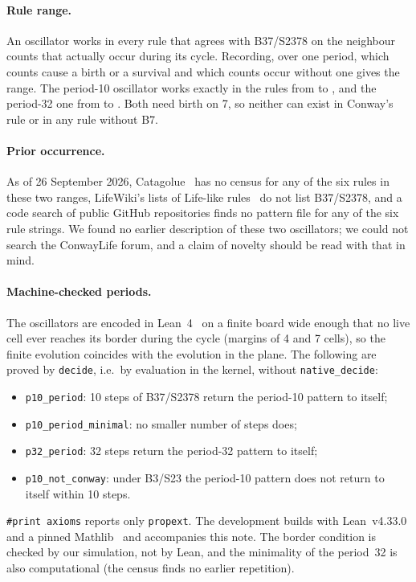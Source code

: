 \documentclass[11pt,a4paper]{article}
\begin{document}
\paragraph{Rule range.} An oscillator works in every rule that agrees with B37/S2378
on the neighbour counts that actually occur during its cycle. Recording, over one
period, which counts cause a birth or a survival and which counts occur without one
gives the range. The period-10 oscillator works exactly in the rules from
\minDiez{} to \maxDiez{}, and the period-32 one from \minTreintaydos{} to
\maxTreintaydos{}. Both need birth on 7, so neither can exist in Conway's rule or in any
rule without B7.

\paragraph{Prior occurrence.} As of 26 September 2026, Catagolue~\cite{catagolue} has
no census for any of the six rules in these two ranges, LifeWiki's lists of Life-like
rules~\cite{lifewiki-lifelike,lifewiki-universal} do not list B37/S2378, and a code
search of public GitHub repositories finds no pattern file for any of the six rule
strings. We found no earlier description of these two oscillators; we could not
search the ConwayLife forum, and a claim of novelty should be read with that in mind.

\paragraph{Machine-checked periods.} The oscillators are encoded in Lean~4~\cite{lean4} on a finite
board wide enough that no live cell ever reaches its border during the cycle (margins
of 4 and 7 cells), so the finite evolution coincides with the evolution in the plane.
The following are proved by \texttt{decide}, i.e.\ by evaluation in the kernel, without
\texttt{native\_decide}:
\begin{itemize}
\item \texttt{p10\_period}: 10 steps of B37/S2378 return the period-10 pattern to itself;
\item \texttt{p10\_period\_minimal}: no smaller number of steps does;
\item \texttt{p32\_period}: 32 steps return the period-32 pattern to itself;
\item \texttt{p10\_not\_conway}: under B3/S23 the period-10 pattern does not return to
itself within 10 steps.
\end{itemize}
\texttt{\#print axioms} reports only \texttt{propext}. The development builds with
Lean~v4.33.0 and a pinned Mathlib~\cite{mathlib} and accompanies this note. The border condition is
checked by our simulation, not by Lean, and the minimality of the period~32 is also
computational (the census finds no earlier repetition).
\end{document}
